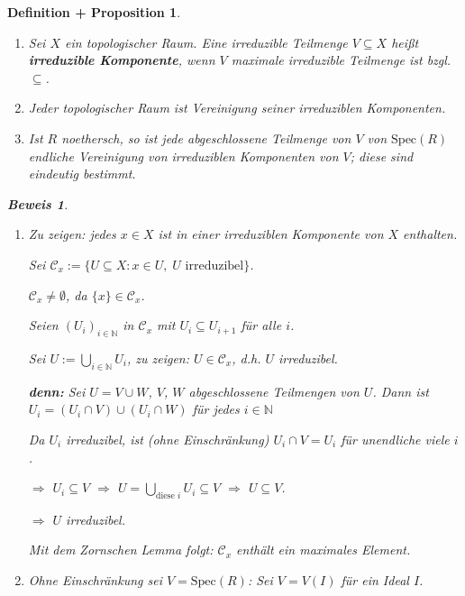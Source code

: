 \documentclass[a4paper,12pt]{scrbook}
\theoremstyle{break}
\newtheorem{DefProp}[Def]{Definition + Proposition}
\theoremstyle{nonumberbreak}
\newtheorem{Bew}{Beweis}
\theoremstyle{nonumberplain}
\newcommand{\emp}[1]{\textbf{\emph{#1}}}
\begin{document}
\begin{DefProp}
\begin{enumerate}
\item[a)] Sei $X$ ein topologischer Raum. Eine irreduzible Teilmenge $V \subseteq X$ heißt \emp{irreduzible Komponente}, wenn $V$ maximale irreduzible Teilmenge ist bzgl. $\subseteq$.

\item[b)] Jeder topologischer Raum ist Vereinigung seiner irreduziblen Komponenten.

\item[c)] Ist $R$ noethersch, so ist jede abgeschlossene Teilmenge von $V$ von $\textrm{Spec}(R)$ endliche Vereinigung von irreduziblen Komponenten von $V$; diese sind eindeutig bestimmt.

\end{enumerate}

\begin{Bew}
\begin{enumerate}

\item[b)] Zu zeigen: jedes $x \in X$ ist in einer irreduziblen Komponente von $X$ enthalten.

Sei $\mathcal{C}_x := \{ U \subseteq X : x \in U,\; U \text{ irreduzibel} \}$.

$\mathcal{C}_x \neq \emptyset$, da $\{ x \} \in \mathcal{C}_x$.

Seien $(U_i)_{i \in \mathbb{N}}$ in $\mathcal{C}_x$ mit $U_i \subseteq U_{i+1}$ für alle $i$.

Sei $U := \bigcup_{i \in \mathbb{N}} U_i$, zu zeigen: $U \in \mathcal{C}_x$, d.h. $U$ irreduzibel.

\textbf{denn:} Sei $U = V \cup W$, $V$, $W$ abgeschlossene Teilmengen von $U$. Dann ist $U_i = (U_i \cap V) \cup (U_i \cap W)$ für jedes $i \in \mathbb{N}$

Da $U_i$ irreduzibel, ist (ohne Einschränkung) $U_i \cap V = U_i$ für unendliche viele $i$.

$\Rightarrow$ $U_i \subseteq V$ $\Rightarrow$ $U = \bigcup_{\text{diese }i} U_i \subseteq V$ $\Rightarrow$ $U \subseteq V$.

$\Rightarrow$ $U$ irreduzibel.

Mit dem Zornschen Lemma folgt: $\mathcal{C}_x$ enthält ein maximales Element.

\item[c)] Ohne Einschränkung sei $V = \textrm{Spec}(R)$: Sei $V = V(I)$ für ein Ideal $I$.


\end{enumerate}
\end{Bew}
\end{DefProp}
\end{document}
